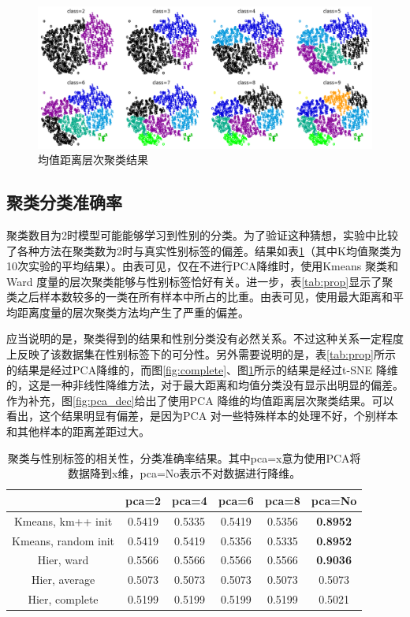 \begin{figure}
\centering
\includegraphics[width=15cm]{resource/average.png}
\caption{均值距离层次聚类结果}
\label{fig:average}
\end{figure}

\subsection{聚类分类准确率}
聚类数目为2时模型可能能够学习到性别的分类。为了验证这种猜想，实验中比较了各种方法在聚类数为2时与真实性别标签的偏差。结果如表\ref{tab:class}（其中K均值聚类为10次实验的平均结果）。由表可见，仅在不进行PCA降维时，使用{\ttfamily Kmeans} 聚类和{\ttfamily Ward} 度量的层次聚类能够与性别标签恰好有关。进一步，表\ref{tab:prop}显示了聚类之后样本数较多的一类在所有样本中所占的比重。由表可见，使用最大距离和平均距离度量的层次聚类方法均产生了严重的偏差。

应当说明的是，聚类得到的结果和性别分类没有必然关系。不过这种关系一定程度上反映了该数据集在性别标签下的可分性。另外需要说明的是，表\ref{tab:prop}所示的结果是经过{\ttfamily PCA}降维的，而图\ref{fig:complete}、图\ref{fig:average}所示的结果是经过{\ttfamily t-SNE} 降维的，这是一种非线性降维方法，对于最大距离和均值分类没有显示出明显的偏差。作为补充，图\ref{fig:pca_dec}给出了使用{\ttfamily PCA} 降维的均值距离层次聚类结果。可以看出，这个结果明显有偏差，是因为{\ttfamily PCA} 对一些特殊样本的处理不好，个别样本和其他样本的距离差距过大。

\begin{table}[htbp]
\centering
\begin{tabular}{cccccc}
\toprule
{} &   pca=2 &   pca=4 &   pca=6 &   pca=8 &  pca=No \\
\midrule
Kmeans, km++ init   &  0.5419 &  0.5335 &  0.5419 &  0.5356 &  \textbf{0.8952} \\
Kmeans, random init &  0.5419 &  0.5419 &  0.5356 &  0.5335 &  \textbf{0.8952} \\
Hier, ward          &  0.5566 &  0.5566 &  0.5566 &  0.5566 &  \textbf{0.9036} \\
Hier, average       &  0.5073 &  0.5073 &  0.5073 &  0.5073 &  0.5073 \\
Hier, complete      &  0.5199 &  0.5199 &  0.5199 &  0.5199 &  0.5021 \\
\bottomrule
\end{tabular}
\caption{聚类与性别标签的相关性，分类准确率结果。其中pca=x意为使用PCA将数据降到x维，pca=No表示不对数据进行降维。}
\label{tab:class}
\end{table}

